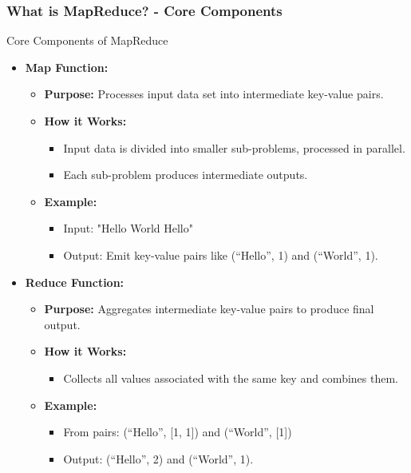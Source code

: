 \documentclass[aspectratio=169]{beamer}
\begin{document}
\begin{frame}[fragile]
  \frametitle{What is MapReduce? - Core Components}
  \begin{block}{Core Components of MapReduce}
    \begin{itemize}
      \item \textbf{Map Function:}
        \begin{itemize}
          \item \textbf{Purpose:} Processes input data set into intermediate key-value pairs.
          \item \textbf{How it Works:}
            \begin{itemize}
              \item Input data is divided into smaller sub-problems, processed in parallel.
              \item Each sub-problem produces intermediate outputs.
            \end{itemize}
          \item \textbf{Example:}
            \begin{itemize}
              \item Input: "Hello World Hello"
              \item Output: Emit key-value pairs like (“Hello”, 1) and (“World”, 1).
            \end{itemize}
        \end{itemize}
      \item \textbf{Reduce Function:}
        \begin{itemize}
          \item \textbf{Purpose:} Aggregates intermediate key-value pairs to produce final output.
          \item \textbf{How it Works:}
            \begin{itemize}
              \item Collects all values associated with the same key and combines them.
            \end{itemize}
          \item \textbf{Example:}
            \begin{itemize}
              \item From pairs: (“Hello”, [1, 1]) and (“World”, [1])
              \item Output: (“Hello”, 2) and (“World”, 1).
            \end{itemize}
        \end{itemize}
    \end{itemize}
  \end{block}
\end{frame}
\end{document}
